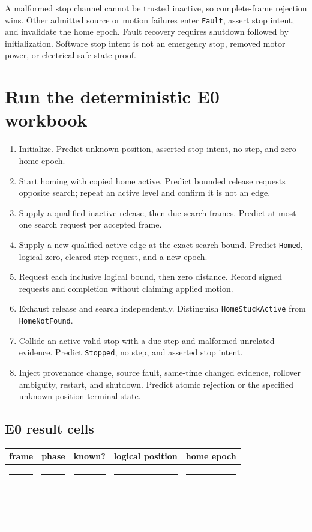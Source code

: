 \documentclass[10pt]{article}
\newcommand{\blankline}{\rule{0.72in}{0.4pt}}
\begin{document}
A malformed stop channel cannot be trusted inactive, so complete-frame
rejection wins. Other admitted source or motion failures enter
\texttt{Fault}, assert stop intent, and invalidate the home epoch. Fault
recovery requires shutdown followed by initialization. Software stop intent
is not an emergency stop, removed motor power, or electrical safe-state proof.

\section{Run the deterministic E0 workbook}
\begin{enumerate}
 \item Initialize. Predict unknown position, asserted stop intent, no step,
       and zero home epoch.
 \item Start homing with copied home active. Predict bounded release requests
       opposite search; repeat an active level and confirm it is not an edge.
 \item Supply a qualified inactive release, then due search frames. Predict
       at most one search request per accepted frame.
 \item Supply a new qualified active edge at the exact search bound. Predict
       \texttt{Homed}, logical zero, cleared step request, and a new epoch.
 \item Request each inclusive logical bound, then zero distance. Record signed
       requests and completion without claiming applied motion.
 \item Exhaust release and search independently. Distinguish
       \texttt{HomeStuckActive} from \texttt{HomeNotFound}.
 \item Collide an active valid stop with a due step and malformed unrelated
       evidence. Predict \texttt{Stopped}, no step, and asserted stop intent.
 \item Inject provenance change, source fault, same-time changed evidence,
       rollover ambiguity, restart, and shutdown. Predict atomic rejection or
       the specified unknown-position terminal state.
\end{enumerate}

\subsection*{E0 result cells}
\begin{tabularx}{\linewidth}{@{}X X X X X@{}}
\toprule
frame & phase & known? & logical position & home epoch\\
\midrule
\rule{0pt}{16pt}\blankline & \blankline & \blankline & \blankline & \blankline\\[9pt]
\blankline & \blankline & \blankline & \blankline & \blankline\\[9pt]
\blankline & \blankline & \blankline & \blankline & \blankline\\
\bottomrule
\end{tabularx}
\end{document}
